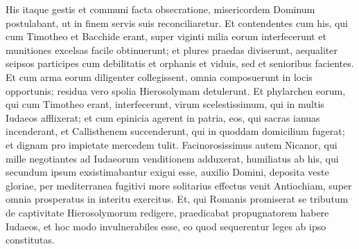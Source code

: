 \begin{biblechapter}
\begin{biblechapter}
\begin{biblechapter}
\begin{biblechapter}
\begin{biblechapter}
\begin{biblechapter}
\begin{biblechapter}
\begin{biblechapter}
\verse His itaque gestis et communi facta obsecratione, misericordem Dominum postulabant, ut in finem servis suis reconciliaretur.
 \verse Et contendentes cum his, qui cum Timotheo et Bacchide erant, super viginti milia eorum interfecerunt et munitiones excelsas facile obtinuerunt; et plures praedas diviserunt, aequaliter seipsos participes cum debilitatis et orphanis et viduis, sed et senioribus facientes. 
\verse Et cum arma eorum diligenter collegissent, omnia composuerunt in locis opportunis; residua vero spolia Hierosolymam detulerunt. 
\verse Et phylarchen eorum, qui cum Timotheo erant, interfecerunt, virum scelestissimum, qui in multis Iudaeos afflixerat; 
\verse et cum epinicia agerent in patria, eos, qui sacras ianuas incenderant, et Callisthenem succenderunt, qui in quoddam domicilium fugerat; et dignam pro impietate mercedem tulit. 
\verse Facinorosissimus autem Nicanor, qui mille negotiantes ad Iudaeorum venditionem adduxerat, 
\verse humiliatus ab his, qui secundum ipsum exsistimabantur exigui esse, auxilio Domini, deposita veste gloriae, per mediterranea fugitivi more solitarius effectus venit Antiochiam, super omnia prosperatus in interitu exercitus. 
\verse Et, qui Romanis promiserat se tributum de captivitate Hierosolymorum redigere, praedicabat propugnatorem habere Iudaeos, et hoc modo invulnerabiles esse, eo quod sequerentur leges ab ipso constitutas.
 

\end{biblechapter}
\end{biblechapter}
\end{biblechapter}
\end{biblechapter}
\end{biblechapter}
\end{biblechapter}
\end{biblechapter}
\end{biblechapter}
